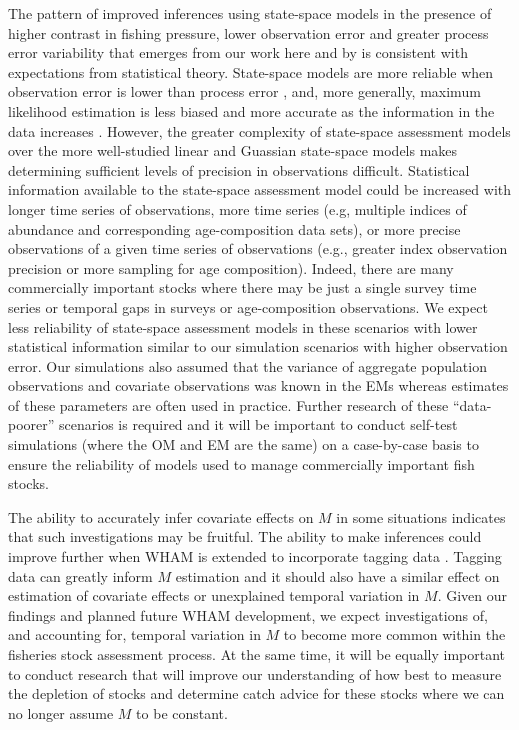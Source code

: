 \documentclass[
  12pt,
]{article}
\begin{document}
The pattern of improved inferences using state-space models in the
presence of higher contrast in fishing pressure, lower observation error
and greater process error variability that emerges from our work here
and by \citet{milleretal26} is consistent with expectations from
statistical theory. State-space models are more reliable when
observation error is lower than process error \citep{augermetheetal16},
and, more generally, maximum likelihood estimation is less biased and
more accurate as the information in the data increases
\citep{neymanscott48, kieferwolfowitz56}. However, the greater
complexity of state-space assessment models over the more well-studied
linear and Guassian state-space models makes determining sufficient
levels of precision in observations difficult. Statistical information
available to the state-space assessment model could be increased with
longer time series of observations, more time series (e.g, multiple
indices of abundance and corresponding age-composition data sets), or
more precise observations of a given time series of observations (e.g.,
greater index observation precision or more sampling for age
composition). Indeed, there are many commercially important stocks where
there may be just a single survey time series or temporal gaps in
surveys or age-composition observations. We expect less reliability of
state-space assessment models in these scenarios with lower statistical
information similar to our simulation scenarios with higher observation
error. Our simulations also assumed that the variance of aggregate
population observations and covariate observations was known in the EMs
whereas estimates of these parameters are often used in practice.
Further research of these ``data-poorer'' scenarios is required and it
will be important to conduct self-test simulations (where the OM and EM
are the same) on a case-by-case basis to ensure the reliability of
models used to manage commercially important fish stocks.

The ability to accurately infer covariate effects on \(M\) in some
situations indicates that such investigations may be fruitful. The
ability to make inferences could improve further when WHAM is extended
to incorporate tagging data \citep{milleretal25}. Tagging data can
greatly inform \(M\) estimation \citep{pollocketal91, hampton00} and it
should also have a similar effect on estimation of covariate effects or
unexplained temporal variation in \(M\). Given our findings and planned
future WHAM development, we expect investigations of, and accounting
for, temporal variation in \(M\) to become more common within the
fisheries stock assessment process. At the same time, it will be equally
important to conduct research that will improve our understanding of how
best to measure the depletion of stocks and determine catch advice for
these stocks where we can no longer assume \(M\) to be constant.
\end{document}
